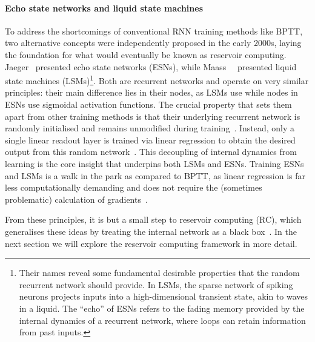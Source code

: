 \paragraph{Echo state networks and liquid state machines}
To address the shortcomings of conventional RNN training methods like BPTT, two alternative concepts were independently proposed in the early 2000s, laying the foundation for what would eventually be known as reservoir computing.
Jaeger~\cite{jaeger2001echo} presented echo state networks (ESNs), while Maass~\etal~\cite{maass_LSM} presented liquid state machines (LSMs)\footnote{
	Their names reveal some fundamental desirable properties that the random recurrent network should provide.
	In LSMs, the sparse network of spiking neurons projects inputs into a high-dimensional transient state, akin to waves in a liquid.
	The ``echo'' of ESNs refers to the fading memory provided by the internal dynamics of a recurrent network, where loops can retain information from past inputs.
}.
Both are recurrent networks and operate on very similar principles: their main difference lies in their nodes, as LSMs use  while nodes in ESNs use sigmoidal activation functions.
The crucial property that sets them apart from other training methods is that their underlying recurrent network is randomly initialised and remains unmodified during training~\cite{ReviewESNs,RC_Tensegrity}.
Instead, only a single linear readout layer is trained via linear regression to obtain the desired output from this random network~\cite{D-LSM,D-ESN-Improved}.
This decoupling of internal dynamics from learning is the core insight that underpins both LSMs and ESNs.
Training ESNs and LSMs is a walk in the park as compared to BPTT, as linear regression is far less computationally demanding and does not require the (sometimes problematic) calculation of gradients~\cite{D-ESN-Improved}. \par
From these principles, it is but a small step to reservoir computing (RC), which generalises these ideas by treating the internal network as a black box~\cite{RC_unification,D-ESN-Improved,RC_Tensegrity}.
In the next section we will explore the reservoir computing framework in more detail.

